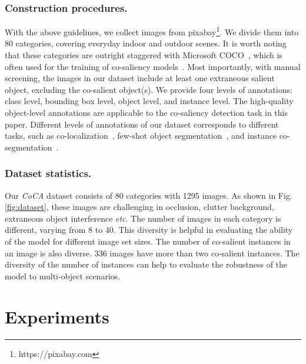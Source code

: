\documentclass[runningheads,orivec]{llncs}
\newcommand{\figref}[1]{Fig. \ref{#1}}
\def\etc{\emph{etc}}
\begin{document}
\subsubsection{Construction procedures.}
With the above guidelines, we collect images from pixabay\footnote{https://pixabay.com}.
We divide them into 80 categories, covering everyday indoor and outdoor scenes.
It is worth noting that these categories are outright staggered with Microsoft COCO~\cite{lin2014microsoft}, 
which is often used for the training of co-saliency models~\cite{wei2019deep,li2019detecting,wang2019robust}.
Most importantly, with manual screening, the images in our dataset include at least one extraneous salient object, excluding the co-salient object(s).
We provide four levels of annotations: class level, bounding box level, object level, and instance level.
The high-quality object-level annotations are applicable to the co-saliency detection task in this paper.
Different levels of annotations of our dataset corresponds to different tasks, such as co-localization~\cite{joulin2014efficient,tang2014co}, few-shot object segmentation~\cite{zhang2018sgone,zhang2019canet}, and instance co-segmentation~\cite{sun2017learning}.


\subsubsection{Dataset statistics.}
Our \textit{CoCA} dataset consists of 80 categories with 1295 images. 
As shown in \figref{fig:dataset},
these images are challenging in occlusion, clutter background, extraneous object interference \etc.
The number of images in each category is different, varying from 8 to 40.
This diversity is helpful in evaluating the ability of the model for different image set sizes.
The number of co-salient instances in an image is also diverse. 
336 images have more than two co-salient instances.
The diversity of the number of instances can help to evaluate the robustness of the model to multi-object scenarios.




\section{Experiments}
\label{sec:experiments}
\end{document}
